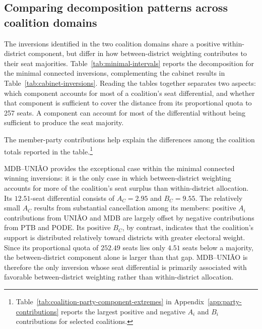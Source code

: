 \documentclass[11pt]{article}
\begin{document}
\subsection{Comparing decomposition patterns across coalition domains}
\label{sec:decomposition}


The inversions identified in the two coalition domains share a positive
within-district component, but differ in how between-district weighting
contributes to their seat majorities. Table~\ref{tab:minimal-intervals}
reports the decomposition for the minimal connected inversions,
complementing the cabinet results in
Table~\ref{tab:cabinet-inversions}. Reading the tables together separates
two aspects: which component accounts for most of a coalition's seat
differential, and whether that component is sufficient to cover the
distance from its proportional quota to 257 seats. A component can account
for most of the differential without being sufficient to produce the
seat majority.

\begin{table}[htbp]
\centering
\caption{Minimal connected winning inversions and
seat-differential decomposition}
\label{tab:minimal-intervals}
\footnotesize
\setlength{\tabcolsep}{3pt}
\renewcommand{\arraystretch}{1.06}

\end{table}
\FloatBarrier


The member-party contributions help explain the differences among the
coalition totals reported in the table.\footnote{Table~\ref{tab:coalition-party-component-extremes}
in Appendix~\ref{app:party-contributions} reports the largest positive and
negative \(A_i\) and \(B_i\) contributions for selected coalitions.}

MDB--UNIÃO provides the exceptional case within the minimal connected winning
inversions: it is the only case in which between-district weighting accounts for
more of the coalition's seat surplus than within-district allocation. Its
\(12.51\)-seat differential consists of \(A_C=2.95\) and \(B_C=9.55\). The
relatively small \(A_C\) results from substantial cancellation among its
members: positive \(A_i\) contributions from UNIÃO and MDB are largely offset by
negative contributions from PTB and PODE. Its positive \(B_C\), by contrast,
indicates that the coalition's support is distributed relatively toward
districts with greater electoral weight. Since its proportional quota of
\(252.49\) seats lies only \(4.51\) seats below a majority, the between-district
component alone is larger than that gap. MDB--UNIÃO is therefore the only
inversion whose seat differential is primarily associated with favorable
between-district weighting rather than within-district allocation.
\end{document}
